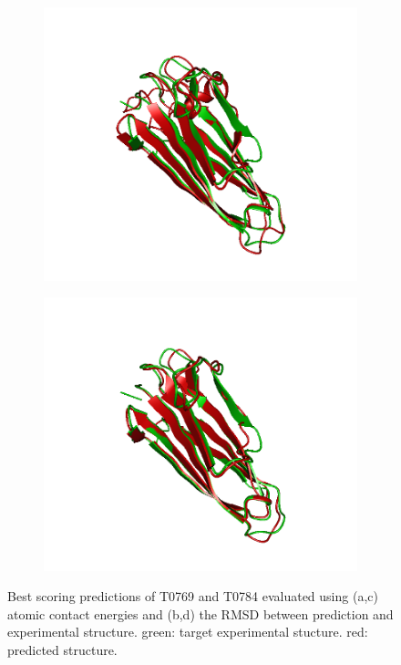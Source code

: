 \documentclass[11pt,a4paper]{article}
\begin{document}
\begin{figure}
	\begin{subfigure}{.5\textwidth}
		\includegraphics[width=\textwidth]{figures/T0784TS117}
	\end{subfigure}
	\begin{subfigure}{.5\textwidth}
		\includegraphics[width=\textwidth]{figures/T0784TS156}
	\end{subfigure}
	\caption{Best scoring predictions of T0769 and T0784 evaluated using (a,c) atomic contact energies and (b,d) the RMSD between prediction and experimental structure. green: target experimental stucture. red: predicted structure.}
	\label{fig:visualize}
\end{figure}
\end{document}
